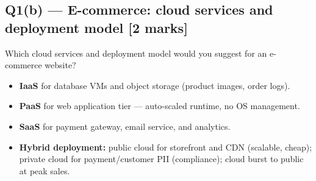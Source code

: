 \documentclass[12pt, a4paper]{article}
\newenvironment{qbox}{\begin{mdframed}[style=qframe]}{\end{mdframed}}
\newenvironment{solbox}{\begin{mdframed}[style=solframe]}{\end{mdframed}}
\newcommand{\qmarks}[1]{\hfill\textbf{\color{orange!70!black}[#1 marks]}}
\begin{document}
\subsection{Q1(b) --- E-commerce: cloud services and deployment model
  \texorpdfstring{\qmarks{2}}{}}
\begin{qbox}Which cloud services and deployment model would you suggest for an e-commerce
website?\end{qbox}
\begin{solbox}
\begin{itemize}[leftmargin=1.4cm, itemsep=1pt]
  \item \textbf{IaaS} for database VMs and object storage (product images, order logs).
  \item \textbf{PaaS} for web application tier --- auto-scaled runtime, no OS management.
  \item \textbf{SaaS} for payment gateway, email service, and analytics.
  \item \textbf{Hybrid deployment:} public cloud for storefront and CDN (scalable, cheap);
    private cloud for payment/customer PII (compliance); cloud burst to public at peak sales.
\end{itemize}
\end{solbox}

\end{document}
